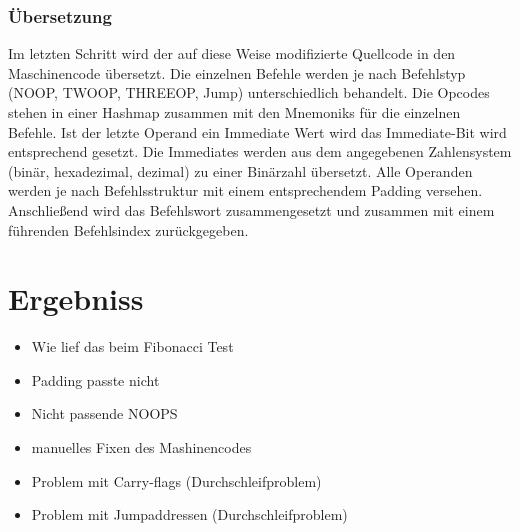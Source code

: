 \documentclass[paper=a4,fontsize=12pt,twocolumn]{scrreprt}
\begin{document}
\subsection{Übersetzung}
Im letzten Schritt wird der auf diese Weise modifizierte Quellcode in den Maschinencode übersetzt.
Die einzelnen Befehle werden je nach Befehlstyp (NOOP, TWOOP, THREEOP, Jump) unterschiedlich behandelt.
Die Opcodes stehen in einer Hashmap zusammen mit den Mnemoniks für die einzelnen Befehle.
Ist der letzte Operand ein Immediate Wert wird das Immediate-Bit wird entsprechend gesetzt.
Die Immediates werden aus dem angegebenen Zahlensystem (binär, hexadezimal, dezimal) zu einer Binärzahl übersetzt.
Alle Operanden werden je nach Befehlsstruktur mit einem entsprechendem Padding versehen.
Anschließend wird das Befehlswort zusammengesetzt und zusammen mit einem führenden Befehlsindex zurückgegeben.


\chapter{Ergebniss}



\begin{itemize}
    \item Wie lief das beim Fibonacci Test
    \item Padding passte nicht
    \item Nicht passende NOOPS
    \item manuelles Fixen des Mashinencodes
    \item Problem mit Carry-flags (Durchschleifproblem)
    \item Problem mit Jumpaddressen (Durchschleifproblem)
\end{itemize}
\end{document}
